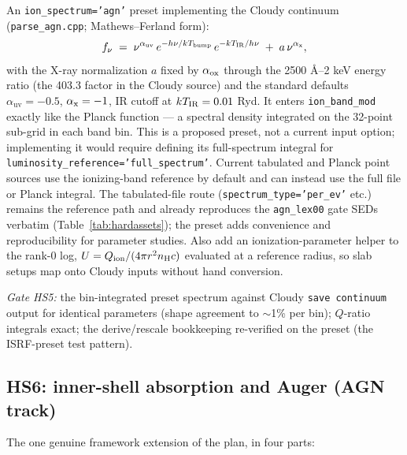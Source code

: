 \documentclass[english,a4paper]{my_memo}
\newcommand{\code}[1]{\texttt{#1}}
\begin{document}
An \code{ion\_spectrum='agn'} preset implementing the Cloudy continuum
(\code{parse\_agn.cpp}; Mathews--Ferland form):
\begin{equation}
 f_\nu \;=\; \nu^{\alpha_{\text{uv}}}\,
   e^{-h\nu/kT_{\rm bump}}\, e^{-kT_{\rm IR}/h\nu}
   \;+\; a\,\nu^{\alpha_{\rm x}} ,
 \label{eq:agnsed}
\end{equation}
with the X-ray normalization $a$ fixed by $\alpha_{\rm ox}$ through the
2500 \AA--2 keV energy ratio (the 403.3 factor in the Cloudy source)
and the standard defaults $\alpha_{\text{uv}}=-0.5$,
$\alpha_{\rm x}=-1$, IR cutoff at $kT_{\rm IR}=0.01$ Ryd.  It enters
\code{ion\_band\_mod} exactly like the Planck function --- a spectral
density integrated on the 32-point sub-grid in each band bin.  This is
a proposed preset, not a current input option; implementing it would
require defining its full-spectrum integral for
\code{luminosity\_reference='full\_spectrum'}.  Current tabulated and
Planck point sources use the ionizing-band reference by default and
can instead use the full file or Planck integral.  The
tabulated-file route (\code{spectrum\_type='per\_ev'} etc.) remains the
reference path and already reproduces the \code{agn\_lex00} gate SEDs
verbatim (Table~\ref{tab:hardassets}); the preset adds convenience and
reproducibility for parameter studies.  Also add an
ionization-parameter helper to the rank-0 log,
$U = Q_{\rm ion}/(4\pi r^2 n_{\rm H} c)$ evaluated at a reference
radius, so slab setups map onto Cloudy inputs without hand conversion.

\emph{Gate HS5:} the bin-integrated preset spectrum against Cloudy
\code{save continuum} output for identical parameters (shape agreement
to $\sim$1\% per bin); $Q$-ratio integrals exact; the derive/rescale
bookkeeping re-verified on the preset (the ISRF-preset test pattern).

\subsection{HS6: inner-shell absorption and Auger (AGN track)}

The one genuine framework extension of the plan, in four parts:
\end{document}
